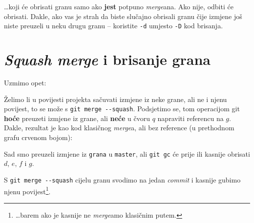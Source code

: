 
\dots{}koji će obrisati granu samo ako \textbf{jest} potpuno \emph{merge}ana.
Ako nije, odbiti će obrisati.
Dakle, ako vas je strah da biste slučajno obrisali granu čije izmjene još niste preuzeli u neku drugu granu -- koristite \verb+-d+ umjesto \verb+-D+ kod brisanja.

\section*{\emph{Squash merge} i brisanje grana}

Uzmimo opet:



Želimo li u povijesti projekta sačuvati izmjene iz neke grane, ali ne i njenu povijest, to se može s \verb+git merge --squash+.
Podsjetimo se, tom operacijom git \textbf{hoće} preuzeti izmjene iz grane, ali \textbf{neće} u čvoru $q$ napraviti referencu na $g$.
Dakle, rezultat je kao kod klasičnog \emph{merge}a, ali bez reference (u prethodnom grafu crvenom bojom):



Sad smo preuzeli izmjene iz \verb+grana+ u \verb+master+, ali \verb+git gc+ će prije ili kasnije obrisati $d$, $e$, $f$ i $g$.

S \verb+git merge --squash+ cijelu granu svodimo na jedan \emph{commit} i kasnije gubimo njenu povijest\footnote{\dots{}barem ako je kasnije ne \emph{merge}amo klasičnim putem.}.
